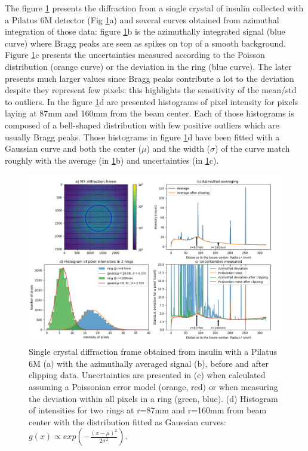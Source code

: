 \documentclass[preprint]{iucr}              %
\begin{document}
The figure \ref{fig2} presents the diffraction from a single crystal of insulin collected with a Pilatus 6M detector (Fig \ref{fig2}a) and several curves obtained from azimuthal integration of those data: 
figure \ref{fig2}b is the azimuthally integrated signal (blue curve) where Bragg peaks are seen as spikes on top of a smooth background.
Figure \ref{fig2}c presents the uncertainties measured according to the Poisson distribution (orange curve) %
or the deviation in the ring (blue curve). 
The later presents much larger values since Bragg peaks contribute a lot to the deviation despite they represent few pixels: this highlights the sensitivity of the mean/std to outliers.
In the figure \ref{fig2}d are presented histograms of pixel intensity for pixels laying at 87mm and 160mm from the beam center. 
Each of those histograms is composed of a bell-shaped distribution with 
few positive outliers which are usually Bragg peaks.   
Those histograms in figure \ref{fig2}d have been fitted with a Gaussian curve and both the center ($\mu$) and the width ($\sigma$) of the curve match 
roughly with the average (in \ref{fig2}b) and uncertainties (in \ref{fig2}c).  
\begin{figure}
\label{fig2}
\begin{center}
\includegraphics[width=14cm]{fig2}
\caption{Single crystal diffraction frame obtained from insulin with a Pilatus 6M (a) with the azimuthally averaged signal (b), 
before and after clipping data. Uncertainties are presented in (c) when calculated assuming a Poissonian error model (orange, red) or when measuring the deviation within all pixels in a ring (green, blue).
(d) Histogram of intensities for two rings at r=87mm and r=160mm from beam center with the distribution fitted as Gaussian curves: $g(x)\propto exp(-\frac{(x-\mu)^2}{2\sigma^2})$.}
\end{center}
\end{figure}
\end{document}
